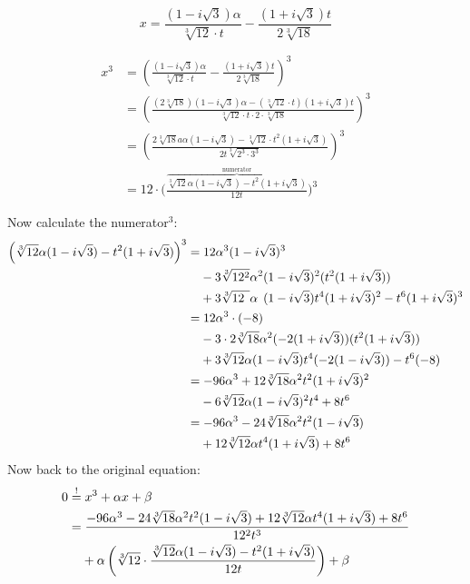 
\[x = \frac{(1-i \sqrt{3}) \alpha}{\sqrt[3]{12} \cdot t}
     -\frac{(1+i\sqrt{3}) t}{2\sqrt[3]{18}}\]

\begin{align}
    x^3 &= \left (\frac{(1-i \sqrt{3}) \alpha}{\sqrt[3]{12} \cdot t} - \frac{(1+i\sqrt{3}) t}{2\sqrt[3]{18}} \right)^3\\
    &= \left (\frac{(2\sqrt[3]{18})(1-i \sqrt{3}) \alpha - (\sqrt[3]{12} \cdot t)(1+i\sqrt{3}) t}{\sqrt[3]{12} \cdot t \cdot 2 \cdot \sqrt[3]{18}} \right)^3\\
    &= \left (\frac{2\sqrt[3]{18}a \alpha (1-i \sqrt{3}) - \sqrt[3]{12} \cdot t^2(1+i\sqrt{3})}{2t \sqrt[3]{2^3 \cdot 3^3}} \right )^3\\
    &= 12 \cdot \bigg (\frac{\overbrace{\sqrt[3]{12} \alpha (1-i \sqrt{3}) - t^2(1+i\sqrt{3})}^{\text{numerator}}}{12t} \bigg )^3
\end{align}

Now calculate the numerator$^3$:
\begin{align}
    \left (\sqrt[3]{12} \alpha (1-i \sqrt{3}) - t^2(1+i\sqrt{3}) \right )^3 &= 
    12 \alpha^3 (1-i\sqrt{3})^3 \\
    &\hphantom{{}=}- 3 \sqrt[3]{12^2} \alpha^2(1-i\sqrt{3})^2 (t^2(1+i \sqrt{3}))\\
    &\hphantom{{}=}+ 3 \sqrt[3]{12\hphantom{^2}} \alpha\hphantom{^2} (1-i\sqrt{3}) t^4 (1+i\sqrt{3})^2 - t^6 (1+i\sqrt{3})^3\\
    &= 12 \alpha^3 \cdot (-8) \\
    &\hphantom{{}=}- 3 \cdot 2 \sqrt[3]{18} \alpha^2(-2(1+i\sqrt{3}))(t^2(1+i \sqrt{3}))\\
    &\hphantom{{}=}+ 3 \sqrt[3]{12} \alpha (1-i\sqrt{3}) t^4 (-2(1-i\sqrt{3})) - t^6 (-8)\\
    &= -96 \alpha^3 + 12 \sqrt[3]{18} \alpha^2 t^2 (1+i \sqrt{3})^2\\
    &\hphantom{{}=}- 6 \sqrt[3]{12} \alpha (1-i\sqrt{3})^2 t^4 +8 t^6\\
    &= -96 \alpha^3 - 24 \sqrt[3]{18} \alpha^2 t^2 (1-i \sqrt{3})\\
    &\hphantom{{}=}+ 12 \sqrt[3]{12} \alpha t^4 (1+i \sqrt{3}) +8 t^6
\end{align}
\goodbreak
Now back to the original equation:
\begin{align}
0 &\stackrel{!}{=} x^3 + \alpha x + \beta\\
  &= \frac{-96 \alpha^3 - 24 \sqrt[3]{18} \alpha^2 t^2 (1-i \sqrt{3}) + 12 \sqrt[3]{12} \alpha t^4 (1+i \sqrt{3}) +8 t^6}{12^2 t^3}\\
  &\hphantom{{}=}+\alpha \left (\sqrt[3]{12} \cdot \frac{\sqrt[3]{12} \alpha (1-i \sqrt{3}) - t^2(1+i\sqrt{3})}{12t} \right ) + \beta
\end{align}

